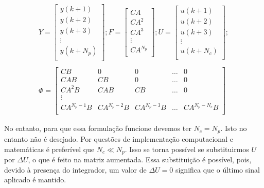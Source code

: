 \begin{equation}
	\begin{split}
		Y=
		\begin{bmatrix}
			y(k+1)   \\
			y(k+2)   \\
			y(k+3)   \\
			\vdots{} \\
			y(k+N_p) \\
		\end{bmatrix};
		F=
		\begin{bmatrix}
			CA       \\
			CA^2     \\
			CA^3     \\
			\vdots{} \\
			CA^{N_p} \\
		\end{bmatrix};
		U=
		\begin{bmatrix}
			u(k+1)   \\
			u(k+2)   \\
			u(k+3)   \\
			\vdots{} \\
			u(k+N_c) \\
		\end{bmatrix};
		\\
		\\
		\Phi=
		\begin{bmatrix}
			CB          & 0           & 0           & \hdots{} & 0             \\
			CAB         & CB          & 0           & \hdots{} & 0             \\
			CA^2B       & CAB         & CB          & \hdots{} & 0             \\
			\vdots{}    &             &             &          &               \\
			CA^{N_p-1}B & CA^{N_p-2}B & CA^{N_p-3}B & \hdots{} & CA^{N_p-N_c}B \\
		\end{bmatrix}
	\end{split}
\end{equation}

No entanto, para que essa formulação funcione devemos ter \( N_c = N_p \). Isto
no entanto não é desejado. Por questões de implementação computacional e
matemáticas é preferível que \( N_c \ll N_p \). Isso se torna possível se
substituirmos \( U \) por \( \Delta{}U \), o que é feito na matriz aumentada.
Essa substituição é possível, pois, devido à presença do integrador, um valor de
\( \Delta{}U = 0 \) significa que o último sinal aplicado é mantido.

